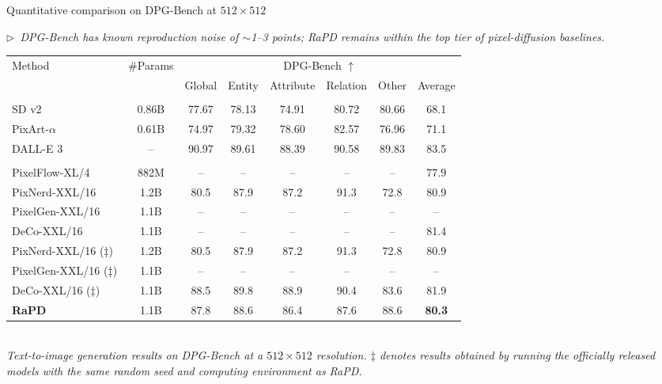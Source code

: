 \documentclass[aspectratio=169,10pt]{beamer}
\newcommand{\story}[1]{%
  {\color{rapdgray}\itshape\footnotesize $\triangleright$~#1\par}\vspace{0.3em}}
\begin{document}
\begin{frame}{Quantitative comparison on \alert{DPG-Bench} at $512\!\times\!512$}
  \story{DPG-Bench has known reproduction noise of $\sim$1--3 points; RaPD remains within the top tier of pixel-diffusion baselines.}
  \begin{center}
  \scriptsize
  \setlength{\tabcolsep}{4pt}
  \begin{tabular}{l|c|cccccc}
    \toprule
    \multirow{2}{*}{Method} & \multirow{2}{*}{\#Params} & \multicolumn{6}{c}{DPG-Bench $\uparrow$}  \\
     &  & Global & Entity & Attribute & Relation & Other & Average \\
    \midrule
    \rowcolor{gray!15}
    \multicolumn{8}{c}{$\triangledown$ \textit{Latent Diffusion Models}} \\
    SD v2            & 0.86B & 77.67 & 78.13 & 74.91 & 80.72 & 80.66 & 68.1 \\
    PixArt-$\alpha$  & 0.61B & 74.97 & 79.32 & 78.60 & 82.57 & 76.96 & 71.1 \\
    DALL-E 3         & --    & 90.97 & 89.61 & 88.39 & 90.58 & 89.83 & 83.5 \\
    \midrule
    \rowcolor{gray!15}
    \multicolumn{8}{c}{$\triangledown$ \textit{Pixel Diffusion Models}} \\
    PixelFlow-XL/4   & 882M  & --    & --    & --    & --    & --    & 77.9 \\
    PixNerd-XXL/16   & 1.2B  & 80.5  & 87.9  & 87.2  & 91.3  & 72.8  & 80.9 \\
    PixelGen-XXL/16  & 1.1B  & --    & --    & --    & --    & --    & --   \\
    DeCo-XXL/16      & 1.1B  & --    & --    & --    & --    & --    & 81.4 \\
    PixNerd-XXL/16 ($\ddagger$)  & 1.2B & 80.5 & 87.9 & 87.2 & 91.3 & 72.8 & 80.9 \\
    PixelGen-XXL/16 ($\ddagger$) & 1.1B & --   & --   & --   & --   & --   & --   \\
    DeCo-XXL/16 ($\ddagger$)     & 1.1B & 88.5 & 89.8 & 88.9 & 90.4 & 83.6 & 81.9 \\
    \midrule
    \rowcolor{lightbluepurple}
    \textbf{RaPD}    & 1.1B  & 87.8  & 88.6  & 86.4  & 87.6  & 88.6  & \textbf{80.3} \\
    \bottomrule
  \end{tabular}\\[0.4em]
  {\scriptsize\itshape\color{rapdgray}Text-to-image generation results on DPG-Bench at a $512\!\times\!512$ resolution. $\ddagger$ denotes results obtained by running the officially released models with the same random seed and computing environment as RaPD.}
  \end{center}
\end{frame}
\end{document}
